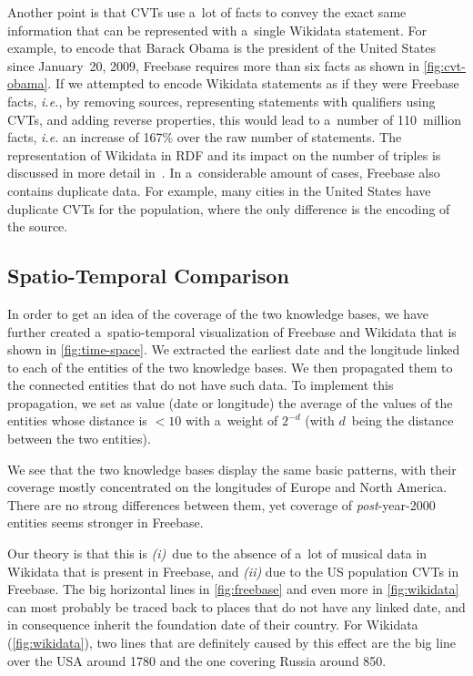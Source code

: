 \documentclass{sig-alternate-2013}
\begin{document}
Another point is that CVTs use a~lot of facts to convey the exact same information
that can be represented with a~single Wikidata statement.
For example, to encode that Barack Obama is the president
of the United States since January~20, 2009,
Freebase requires more than six facts as shown in \autoref{fig:cvt-obama}.
If we attempted to encode Wikidata statements as if they were Freebase facts, \emph{i.e.},
by removing sources, representing statements with qualifiers using CVTs,
and adding reverse properties, this would lead to a~number of 110~million facts,
\emph{i.e.} an increase of 167\% over the raw number of statements.
The representation of Wikidata in RDF and its impact on the number of triples
is discussed in more detail in~\cite{reification-wikidata}.
In a~considerable amount of cases, Freebase also contains duplicate data.
For example, many cities in the United States have duplicate CVTs for the population,
where the only difference is the encoding of the source.

\subsection{Spatio-Temporal Comparison}

In order to get an idea of the coverage of the two knowledge bases,
we have further created a~spatio-temporal visualization of Freebase and Wikidata
that is shown in \autoref{fig:time-space}.
We extracted the earliest date and the longitude
linked to each of the entities of the two knowledge bases.
We then propagated them to the connected entities that do not have such data.
To implement this propagation, we set as value (date or longitude)
the average of the values of the entities whose distance is $<10$
with a~weight of $2^{-d}$ (with $d$~being the distance between the two entities).

We see that the two knowledge bases display the same basic patterns,
with their coverage mostly concentrated on the longitudes of Europe and North America.
There are no strong differences between them,
yet coverage of \emph{post}-year-2000 entities seems stronger in Freebase.

Our theory is that this is
\emph{(i)}~due to the absence of a~lot of musical data in Wikidata that is present in Freebase,
and \emph{(ii)} due to the US population CVTs in Freebase.
The big horizontal lines in \autoref{fig:freebase} and even more in \autoref{fig:wikidata}
can most probably be traced back to places that do not have any linked date,
and in consequence inherit the foundation date of their country.
For Wikidata (\autoref{fig:wikidata}), two lines that are definitely caused by this effect
are the big line over the USA around 1780
and the one covering Russia around 850.
\end{document}
